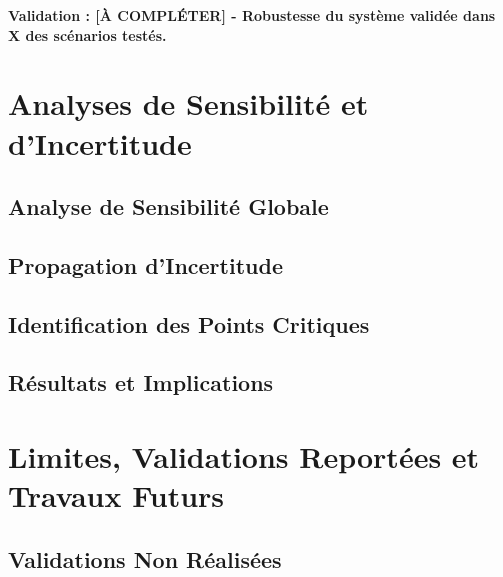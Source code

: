 \textbf{Validation : [À COMPLÉTER] - Robustesse du système validée dans X des scénarios testés.}

\section{Analyses de Sensibilité et d'Incertitude}
\label{sec:analyses_sensibilite}

\subsection{Analyse de Sensibilité Globale}
\label{subsec:sensibilite_globale}

\subsection{Propagation d'Incertitude}
\label{subsec:propagation_incertitude}

\subsection{Identification des Points Critiques}
\label{subsec:points_critiques}

\subsection{Résultats et Implications}
\label{subsec:resultats_sensibilite}

\section{Limites, Validations Reportées et Travaux Futurs}
\label{sec:limites_travaux_futurs}

\subsection{Validations Non Réalisées}
\label{subsec:validations_non_realisees}

